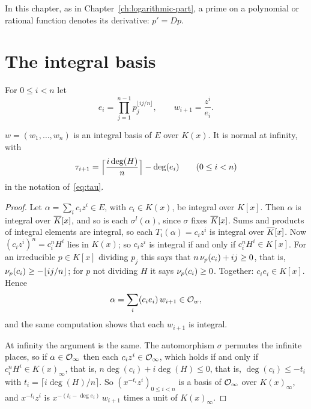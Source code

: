 In this chapter, as in Chapter~\ref{ch:logarithmic-part}, a prime on a
polynomial or rational function denotes its derivative: $p' = Dp$.

\section{The integral basis}\label{sec:radical-basis}

For $0 \le i < n$ let
\begin{equation}\label{eq:radical-basis}
  e_i = \prod_{j=1}^{n-1} p_j^{\lfloor ij/n \rfloor},
  \qquad w_{i+1} = \frac{z^i}{e_i} .
\end{equation}

\begin{theorem}\label{thm:radical-basis}
$w = (w_1, \dots, w_n)$ is an integral basis of $E$ over $K(x)$. It is normal
at infinity, with
\[
  \tau_{i+1} = \Bigl\lceil \frac{i \deg(H)}{n} \Bigr\rceil - \deg(e_i)
  \qquad (0 \le i < n)
\]
in the notation of~\eqref{eq:tau}.
\end{theorem}

\begin{proof}
Let $\alpha = \sum_i c_i z^i \in E$, with $c_i \in K(x)$, be integral over
$K[x]$. Then $\alpha$ is integral over $\overline{K}[x]$, and so is each
$\sigma^l(\alpha)$, since $\sigma$ fixes $\overline{K}[x]$. Sums and products of
integral elements are integral, so each $T_i(\alpha) = c_i z^i$ is integral
over $\overline{K}[x]$. Now $(c_i z^i)^n = c_i^n H^i$ lies in $K(x)$; so $c_i z^i$ is
integral if and only if $c_i^n H^i \in K[x]$. For an irreducible $p \in K[x]$
dividing $p_j$ this says that $n\, \nu_{p}(c_i) + i j \ge 0$, that is,
$\nu_{p}(c_i) \ge -\lfloor ij/n \rfloor$; for $p$ not dividing $H$ it says
$\nu_{p}(c_i) \ge 0$. Together: $c_i e_i \in K[x]$. Hence
\[
  \alpha = \sum_i (c_i e_i)\, w_{i+1} \in \mathcal{O}_w ,
\]
and the same computation shows that each $w_{i+1}$ is integral.

At infinity the argument is the same. The automorphism $\sigma$ permutes the
infinite places, so if $\alpha \in \mathcal{O}_\infty$ then each $c_i z^i \in
\mathcal{O}_\infty$, which holds if and only if $c_i^n H^i \in K(x)_\infty$, that is,
$n \deg(c_i) + i \deg(H) \le 0$, that is, $\deg(c_i) \le -t_i$ with $t_i =
\lceil i \deg(H)/n \rceil$. So $(x^{-t_i} z^i)_{0 \le i < n}$ is a basis of
$\mathcal{O}_\infty$ over $K(x)_\infty$, and $x^{-t_i} z^i$ is $x^{-(t_i - \deg
e_i)}\, w_{i+1}$ times a unit of $K(x)_\infty$.
\end{proof}

